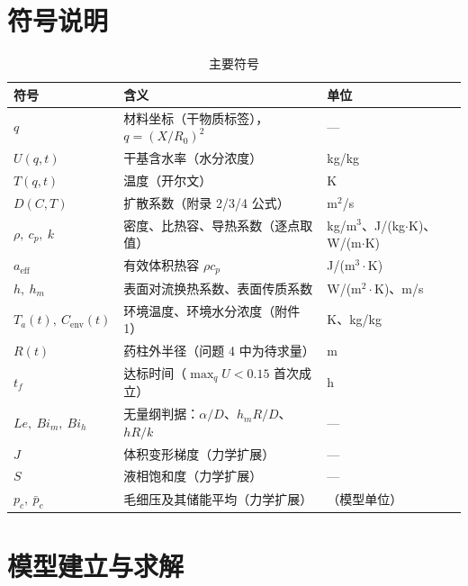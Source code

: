 \documentclass[12pt,a4paper]{ctexart}
\numberwithin{equation}{section}
\begin{document}
\section{符号说明}
\begin{table}[H]
\centering
\caption{主要符号}
\label{tab:符号}
\small
\begin{tabular}{lll}
\toprule
符号 & 含义 & 单位 \\
\midrule
$q$ & 材料坐标（干物质标签），$q=(X/R_0)^2$ & — \\
$U(q,t)$ & 干基含水率（水分浓度） & kg/kg \\
$T(q,t)$ & 温度（开尔文） & K \\
$D(C,T)$ & 扩散系数（附录 2/3/4 公式） & m$^2$/s \\
$\rho,\ c_p,\ k$ & 密度、比热容、导热系数（逐点取值） & kg/m$^3$、J/(kg$\cdot$K)、W/(m$\cdot$K) \\
$a_{\mathrm{eff}}$ & 有效体积热容 $\rho c_p$ & J/(m$^3\cdot$K) \\
$h,\ h_m$ & 表面对流换热系数、表面传质系数 & W/(m$^2\cdot$K)、m/s \\
$T_a(t),\ C_{\mathrm{env}}(t)$ & 环境温度、环境水分浓度（附件 1） & K、kg/kg \\
$R(t)$ & 药柱外半径（问题 4 中为待求量） & m \\
$t_f$ & 达标时间（$\max_q U<0.15$ 首次成立） & h \\
$Le,\ Bi_m,\ Bi_h$ & 无量纲判据：$\alpha/D$、$h_mR/D$、$hR/k$ & — \\
$J$ & 体积变形梯度（力学扩展） & — \\
$S$ & 液相饱和度（力学扩展） & — \\
$p_c,\ \bar p_c$ & 毛细压及其储能平均（力学扩展） & （模型单位） \\
\bottomrule
\end{tabular}
\end{table}

\section{模型建立与求解}
\end{document}
